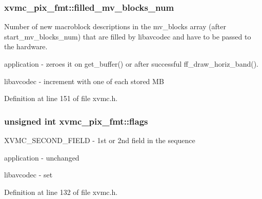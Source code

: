 \subsubsection[{\texorpdfstring{filled\+\_\+mv\+\_\+blocks\+\_\+num}{filled_mv_blocks_num}}]{ xvmc\+\_\+pix\+\_\+fmt\+::filled\+\_\+mv\+\_\+blocks\+\_\+num}\hypertarget{structxvmc__pix__fmt_a817e7fc6d7f524b51dd437ec5a841962}{}\label{structxvmc__pix__fmt_a817e7fc6d7f524b51dd437ec5a841962}
Number of new macroblock descriptions in the mv\+\_\+blocks array (after start\+\_\+mv\+\_\+blocks\+\_\+num) that are filled by libavcodec and have to be passed to the hardware.
\begin{DoxyItemize}
\item application -\/ zeroes it on get\+\_\+buffer() or after successful ff\+\_\+draw\+\_\+horiz\+\_\+band().
\item libavcodec -\/ increment with one of each stored MB 
\end{DoxyItemize}

Definition at line 151 of file xvmc.\+h.

\subsubsection[{\texorpdfstring{flags}{flags}}]{\setlength{\rightskip}{0pt plus 5cm}unsigned {\bf int} xvmc\+\_\+pix\+\_\+fmt\+::flags}\hypertarget{structxvmc__pix__fmt_a2b23d0152e2f0391de5cd97517142899}{}\label{structxvmc__pix__fmt_a2b23d0152e2f0391de5cd97517142899}
X\+V\+M\+C\+\_\+\+S\+E\+C\+O\+N\+D\+\_\+\+F\+I\+E\+LD -\/ 1st or 2nd field in the sequence
\begin{DoxyItemize}
\item application -\/ unchanged
\item libavcodec -\/ set 
\end{DoxyItemize}

Definition at line 132 of file xvmc.\+h.

